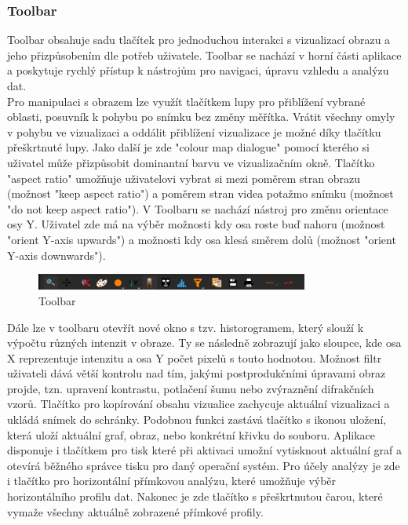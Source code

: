 \documentclass[a4paper,11pt]{article}
\begin{document}
\vspace{1.5cm}


\subsubsection{Toolbar}
Toolbar obsahuje sadu tlačítek pro jednoduchou interakci s vizualizací obrazu a jeho přizpůsobením dle potřeb uživatele. Toolbar se nachází v horní části aplikace a poskytuje rychlý přístup k nástrojům pro navigaci, úpravu vzhledu a analýzu dat.\\

Pro manipulaci s obrazem lze využít tlačítkem lupy pro přiblížení vybrané oblasti, posuvník k pohybu po snímku bez změny měřítka. Vrátit všechny omyly v pohybu ve vizualizaci a oddálit přiblížení vizualizace je možné díky tlačítku přeškrtnuté lupy. Jako další je zde "colour map dialogue" pomocí kterého si uživatel může přizpůsobit dominantní barvu ve vizualizačním okně. Tlačítko "aspect ratio" umožňuje uživatelovi vybrat si mezi poměrem stran obrazu (možnost "keep aspect  ratio") a poměrem stran videa potažmo snímku (možnost "do not keep aspect ratio"). V Toolbaru se nachází nástroj pro změnu orientace osy Y. Uživatel zde má na výběr možnosti kdy osa roste buď nahoru (možnost "orient Y-axis upwards") a možnosti kdy osa klesá směrem dolů (možnost "orient Y-axis downwards").\\

\begin{figure}[H]
	\centering
	\includegraphics[width=0.8\textwidth]{images/Toolbar.png}
	\caption{Toolbar}
\end{figure}

Dále lze v toolbaru otevřít nové okno s tzv. historogramem, který slouží k výpočtu různých intenzit v obraze. Ty se následně zobrazují jako sloupce, kde osa X reprezentuje intenzitu a osa Y počet pixelů s touto hodnotou. Možnost filtr uživateli dává větší kontrolu nad tím, jakými postprodukčními úpravami obraz projde, tzn. upravení kontrastu, potlačení šumu nebo zvýraznění difrakčních vzorů. Tlačítko pro kopírování obsahu vizualice zachycuje aktuální vizualizaci a ukládá snímek do schránky. Podobnou funkci zastává tlačítko s ikonou uložení, která uloží aktuální graf, obraz, nebo konkrétní křivku do souboru. Aplikace disponuje i tlačítkem pro tisk které při aktivaci umožní vytisknout aktuální graf a otevírá běžného správce tisku pro daný operační systém. Pro účely analýzy je zde i tlačítko pro horizontální přímkovou analýzu, které umožňuje výběr horizontálního profilu dat. Nakonec je zde tlačítko s přeškrtnutou čarou, které vymaže všechny aktuálně zobrazené přímkové profily.
\end{document}
